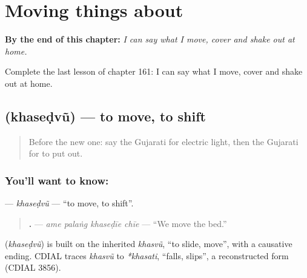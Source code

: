 
\chapter{Moving things about}
\label{ch:gu-moving-things-about}

\begin{chapteropening}
\textbf{By the end of this chapter:} \emph{I can say what I move, cover and shake out at home.}

Complete the last lesson of chapter 161: I can say what I move, cover and shake out at home.
\end{chapteropening}

\section[\texorpdfstring{\gu{ખસેડવું} (khaseḍvũ)}{ખસેડવું (khaseḍvũ)}]{ (khaseḍvũ) — to move, to shift}

\label{lesson:GU-C161-khasedvu}



\begin{quote}
Before the new one: say the Gujarati for electric light, then the Gujarati for to put out.
\end{quote}

\subsection*{You'll want to know: }
\textbf{} — \emph{khaseḍvũ} — \textquotedblleft{}to move, to shift\textquotedblright{}.

\begin{quote}
\textbf{   .} — \emph{ame palaṅg khaseḍīe chīe} — \textquotedblleft{}We move the bed.\textquotedblright{}
\end{quote}

\begin{cousinweb}
\textbf{} (\emph{khaseḍvũ}) is built on the inherited \emph{khasvũ}, \textquotedblleft{}to slide, move\textquotedblright{}, with a causative ending. CDIAL traces \emph{khasvũ} to \emph{*khasati}, \textquotedblleft{}falls, slips\textquotedblright{}, a reconstructed form (CDIAL 3856).
\end{cousinweb}

